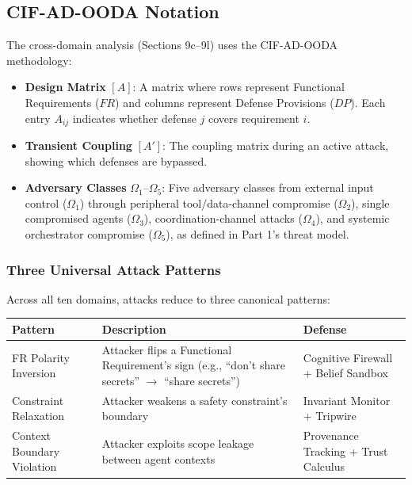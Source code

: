 \documentclass[
]{article}
\newcounter{none} %
\providecommand{\tightlist}{%
  \setlength{\itemsep}{0pt}\setlength{\parskip}{0pt}}
\begin{document}
\subsection{CIF-AD-OODA Notation}\label{cif-ad-ooda-notation}

The cross-domain analysis (Sections 9c--9l) uses the CIF-AD-OODA
methodology:

\begin{itemize}
\tightlist
\item
  \textbf{Design Matrix} \([A]\): A matrix where rows represent
  Functional Requirements (\(FR\)) and columns represent Defense
  Provisions (\(DP\)). Each entry \(A_{ij}\) indicates whether defense
  \(j\) covers requirement \(i\).
\item
  \textbf{Transient Coupling} \([A']\): The coupling matrix during an
  active attack, showing which defenses are bypassed.
\item
  \textbf{Adversary Classes} \(\Omega_1\)--\(\Omega_5\): Five adversary
  classes from external input control (\(\Omega_1\)) through peripheral
  tool/data-channel compromise (\(\Omega_2\)), single compromised agents
  (\(\Omega_3\)), coordination-channel attacks (\(\Omega_4\)), and
  systemic orchestrator compromise (\(\Omega_5\)), as defined in Part
  1's threat model.
\end{itemize}

\subsubsection{Three Universal Attack
Patterns}\label{three-universal-attack-patterns}

Across all ten domains, attacks reduce to three canonical patterns:

{\def\LTcaptype{none} %
\begin{longtable}[]{@{}
  >{\raggedright\arraybackslash}p{}
  >{\raggedright\arraybackslash}p{}
  >{\raggedright\arraybackslash}p{}@{}}
\toprule\noalign{}
\begin{minipage}[b]{\linewidth}\raggedright
Pattern
\end{minipage} & \begin{minipage}[b]{\linewidth}\raggedright
Description
\end{minipage} & \begin{minipage}[b]{\linewidth}\raggedright
Defense
\end{minipage} \\
\midrule\noalign{}
\endhead
\bottomrule\noalign{}
\endlastfoot
FR Polarity Inversion & Attacker flips a Functional Requirement's sign
(e.g., ``don't share secrets'' \texorpdfstring{\ensuremath{\to}}{->} ``share secrets'') & Cognitive Firewall
+ Belief Sandbox \\
Constraint Relaxation & Attacker weakens a safety constraint's boundary
& Invariant Monitor + Tripwire \\
Context Boundary Violation & Attacker exploits scope leakage between
agent contexts & Provenance Tracking + Trust Calculus \\
\end{longtable}
}
\end{document}
